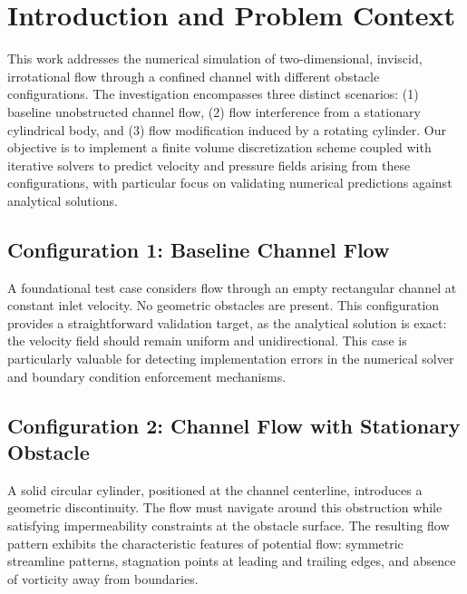 




\newpage
\tableofcontents

\newpage

\section{Introduction and Problem Context}

This work addresses the numerical simulation of two-dimensional, inviscid, irrotational flow through a confined channel with different obstacle configurations. The investigation encompasses three distinct scenarios: (1) baseline unobstructed channel flow, (2) flow interference from a stationary cylindrical body, and (3) flow modification induced by a rotating cylinder. Our objective is to implement a finite volume discretization scheme coupled with iterative solvers to predict velocity and pressure fields arising from these configurations, with particular focus on validating numerical predictions against analytical solutions.

\subsection{Configuration 1: Baseline Channel Flow}

A foundational test case considers flow through an empty rectangular channel at constant inlet velocity. No geometric obstacles are present. This configuration provides a straightforward validation target, as the analytical solution is exact: the velocity field should remain uniform and unidirectional. This case is particularly valuable for detecting implementation errors in the numerical solver and boundary condition enforcement mechanisms.

\subsection{Configuration 2: Channel Flow with Stationary Obstacle}

A solid circular cylinder, positioned at the channel centerline, introduces a geometric discontinuity. The flow must navigate around this obstruction while satisfying impermeability constraints at the obstacle surface. The resulting flow pattern exhibits the characteristic features of potential flow: symmetric streamline patterns, stagnation points at leading and trailing edges, and absence of vorticity away from boundaries.

